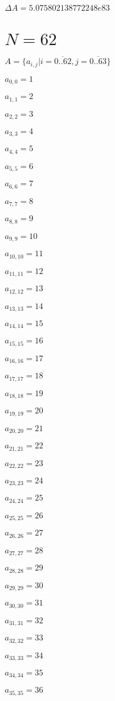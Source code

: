 \documentclass[a4paper,12pt]{article}
\begin{document}
$\Delta A = 5.075802138772248e83$



\section{ $N = 62$ }
$A = \{ a _{ i, j } | i = \overline { 0..62 }, j = \overline { 0..63 } \}$

$a _{ 0, 0 } = 1$

$a _{ 1, 1 } = 2$

$a _{ 2, 2 } = 3$

$a _{ 3, 3 } = 4$

$a _{ 4, 4 } = 5$

$a _{ 5, 5 } = 6$

$a _{ 6, 6 } = 7$

$a _{ 7, 7 } = 8$

$a _{ 8, 8 } = 9$

$a _{ 9, 9 } = 10$

$a _{ 10, 10 } = 11$

$a _{ 11, 11 } = 12$

$a _{ 12, 12 } = 13$

$a _{ 13, 13 } = 14$

$a _{ 14, 14 } = 15$

$a _{ 15, 15 } = 16$

$a _{ 16, 16 } = 17$

$a _{ 17, 17 } = 18$

$a _{ 18, 18 } = 19$

$a _{ 19, 19 } = 20$

$a _{ 20, 20 } = 21$

$a _{ 21, 21 } = 22$

$a _{ 22, 22 } = 23$

$a _{ 23, 23 } = 24$

$a _{ 24, 24 } = 25$

$a _{ 25, 25 } = 26$

$a _{ 26, 26 } = 27$

$a _{ 27, 27 } = 28$

$a _{ 28, 28 } = 29$

$a _{ 29, 29 } = 30$

$a _{ 30, 30 } = 31$

$a _{ 31, 31 } = 32$

$a _{ 32, 32 } = 33$

$a _{ 33, 33 } = 34$

$a _{ 34, 34 } = 35$

$a _{ 35, 35 } = 36$
\end{document}
